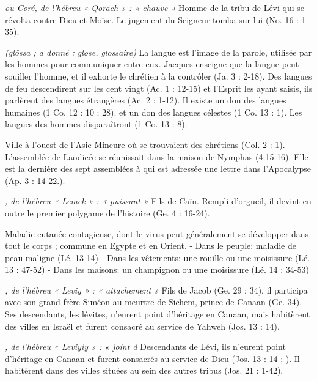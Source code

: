 \begin{multicols}{2}
\textit{ou Coré, de l'hébreu « Qorach » : « chauve »}\newline
Homme de la tribu de Lévi qui se révolta contre Dieu et Moïse. Le jugement du Seigneur tomba sur lui (No. 16 : 1-35).

\textit{(glôssa ; a donné : glose, glossaire)}\newline
La langue est l'image de la parole, utilisée par les hommes pour communiquer entre eux. Jacques enseigne que la langue peut souiller l'homme, et il exhorte le chrétien à la contrôler (Ja. 3 : 2-18). Des langues de feu descendirent sur les cent vingt (Ac. 1 : 12-15) et l’Esprit les ayant saisis, ils parlèrent des langues étrangères (Ac. 2 : 1-12). Il existe un don des langues humaines (1 Co. 12 : 10 ; 28). et un don des langues célestes (1 Co. 13 : 1). Les langues des hommes disparaîtront (1 Co. 13 : 8).

\textit{}\newline
Ville à l'ouest de l'Asie Mineure où se trouvaient des chrétiens (Col. 2 : 1). L'assemblée de Laodicée se réunissait dans la maison de Nymphas (4:15-16). Elle est la dernière des sept assemblées à qui est adressée une lettre dans l'Apocalypse (Ap. 3 : 14-22.).

\textit{, de l'hébreu « Lemek » : « puissant »}\newline
Fils de Caïn. Rempli d'orgueil, il devint en outre le premier polygame de l'histoire (Ge. 4 : 16-24).

\textit{}\newline
Maladie cutanée contagieuse, dont le virus peut généralement se développer dans tout le corps ; commune en Egypte et en Orient.
- Dans le peuple: maladie de peau maligne (Lé. 13-14)
- Dans les vêtements: une rouille ou une moisissure (Lé. 13 : 47-52)
- Dans les maisons: un champignon ou une moisissure (Lé. 14 : 34-53)

\textit{, de l'hébreu « Leviy » : « attachement »}\newline
Fils de Jacob (Ge. 29 : 34), il participa avec son grand frère Siméon au meurtre de Sichem, prince de Canaan (Ge. 34). Ses descendants, les lévites, n'eurent point d'héritage en Canaan, mais habitèrent des villes en Israël et furent consacré au service de Yahweh (Jos. 13 : 14).

\textit{, de l'hébreu « Leviyiy » : « joint à}\newline
Descendants de Lévi, ils n'eurent point d'héritage en Canaan et furent consacrés au service de Dieu (Jos. 13 : 14 ; ). Il habitèrent dans des villes situées au sein des autres tribus (Jos. 21 : 1-42).


\end{multicols}
